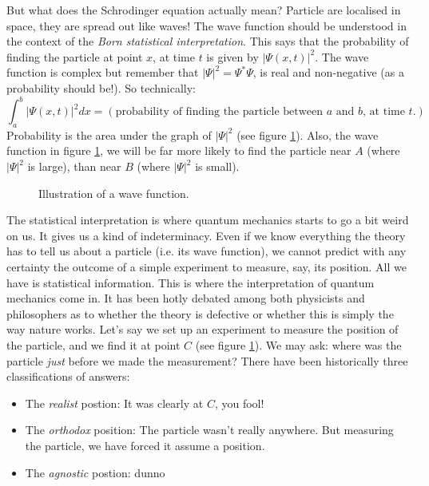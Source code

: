 \documentclass{article}
\begin{document}
But what does the Schrodinger equation actually mean? Particle are localised in space, they are spread out like waves! The wave function should be understood in the context of the \emph{Born statistical interpretation}.  This says that the probability of finding the particle at point $x$, at time $t$ is given by $| \Psi(x,t) |^{2}$. The wave function is complex but remember that $|\Psi |^{2} = \Psi^{*}\Psi$, is real and non-negative (as a probability should be!). So technically:
\begin{equation}
\label{statistical_interpretation}
\int_{a}^{b} |\Psi(x,t)|^{2}dx = \left( \text{probability of finding the particle between $a$ and $b$, at time $t$.} \right)
\end{equation}
Probability is the area under the graph of $|\Psi|^{2}$ (see figure \ref{1}). Also, the wave function in figure \ref{1}, we will be far more likely to find the particle near $A$ (where $|\Psi|^{2}$ is large), than near $B$ (where $|\Psi|^{2}$ is small).
\begin{figure}[h]
\caption{Illustration of a wave function.}
\label{1}
\end{figure}

The statistical interpretation is where quantum mechanics starts to go a bit weird on us. It gives us a kind of indeterminacy. Even if we know everything the theory has to tell us about a particle (i.e. its wave function), we cannot predict with any certainty the outcome of a simple experiment to measure, say, its position. All we have is statistical information. This is where the interpretation of quantum mechanics come in. It has been hotly debated among both physicists and philosophers as to whether the theory is defective or whether this is simply the way nature works. Let's say we set up an experiment to measure the position of the particle, and we find it at point $C$ (see figure \ref{1}). We may ask: where was the particle \emph{just} before we made the measurement? There have been historically three classifications of answers:
\begin{itemize}
\item The \emph{realist} postion: It was clearly at $C$, you fool!
\item The \emph{orthodox} position: The particle wasn't really anywhere. But measuring the particle, we have forced it assume a position.
\item The \emph{agnostic} postion: dunno
\end{itemize}
\end{document}
